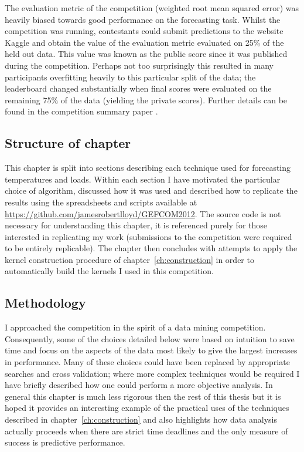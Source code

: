 The evaluation metric of the competition (weighted root mean squared error) was heavily biased towards good performance on the forecasting task.
Whilst the competition was running, contestants could submit predictions to the website Kaggle and obtain the value of the evaluation metric evaluated on 25\% of the held out data.
This value was known as the public score since it was published during the competition.
Perhaps not too surprisingly this resulted in many participants overfitting heavily to this particular split of the data; the leaderboard changed substantially when final scores were evaluated on the remaining 75\% of the data (yielding the private scores).
Further details can be found in the competition summary paper \citep{Hong2014-yf}.

\subsection{Structure of chapter}

This chapter is split into sections describing each technique used for forecasting temperatures and loads.
Within each section I have motivated the particular choice of algorithm, discussed how it was used and described how to replicate the results using the spreadsheets and scripts available at \url{https://github.com/jamesrobertlloyd/GEFCOM2012}.
The source code is not necessary for understanding this chapter, it is referenced purely for those interested in replicating my work (submissions to the competition were required to be entirely replicable).
The chapter then concludes with attempts to apply the kernel construction procedure of chapter~\ref{ch:construction} in order to automatically build the kernels I used in this competition.

\subsection{Methodology}

I approached the competition in the spirit of a data mining competition.
Consequently, some of the choices detailed below were based on intuition to save time and focus on the aspects of the data most likely to give the largest increases in performance.
Many of these choices could have been replaced by appropriate searches and cross validation; where more complex techniques would be required I have briefly described how one could perform a more objective analysis.
In general this chapter is much less rigorous then the rest of this thesis but it is hoped it provides an interesting example of the practical uses of the techniques described in chapter~\ref{ch:construction} and also highlights how data analysis actually proceeds when there are strict time deadlines and the only measure of success is predictive performance.


